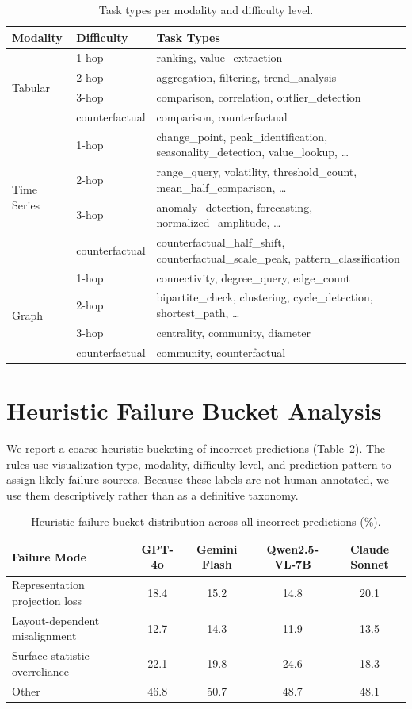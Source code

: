 \documentclass{article}
\begin{document}
\begin{table}[h]
\centering
\small
\caption{Task types per modality and difficulty level.}
\label{tab:task_diff_map}
\begin{tabular}{llp{10cm}}
\toprule
Modality & Difficulty & Task Types \\
\midrule
\multirow{4}{*}{Tabular} & 1-hop & ranking, value\_extraction \\
& 2-hop & aggregation, filtering, trend\_analysis \\
& 3-hop & comparison, correlation, outlier\_detection \\
& counterfactual & comparison, counterfactual \\
\midrule
\multirow{4}{*}{Time Series} & 1-hop & change\_point, peak\_identification, seasonality\_detection, value\_lookup, \ldots \\
& 2-hop & range\_query, volatility, threshold\_count, mean\_half\_comparison, \ldots \\
& 3-hop & anomaly\_detection, forecasting, normalized\_amplitude, \ldots \\
& counterfactual & counterfactual\_half\_shift, counterfactual\_scale\_peak, pattern\_classification \\
\midrule
\multirow{4}{*}{Graph} & 1-hop & connectivity, degree\_query, edge\_count \\
& 2-hop & bipartite\_check, clustering, cycle\_detection, shortest\_path, \ldots \\
& 3-hop & centrality, community, diameter \\
& counterfactual & community, counterfactual \\
\bottomrule
\end{tabular}
\end{table}

\section{Heuristic Failure Bucket Analysis}
\label{sec:failure_buckets}
We report a coarse heuristic bucketing of incorrect predictions (Table~\ref{tab:failure_modes}). The rules use visualization type, modality, difficulty level, and prediction pattern to assign likely failure sources. Because these labels are not human-annotated, we use them descriptively rather than as a definitive taxonomy.

\begin{table}[h]
\centering
\small
\caption{Heuristic failure-bucket distribution across all incorrect predictions (\%).}
\label{tab:failure_modes}
\begin{tabular}{lcccc}
\toprule
Failure Mode & GPT-4o & Gemini Flash & Qwen2.5-VL-7B & Claude Sonnet \\
\midrule
Representation projection loss & 18.4 & 15.2 & 14.8 & 20.1 \\
Layout-dependent misalignment & 12.7 & 14.3 & 11.9 & 13.5 \\
Surface-statistic overreliance & 22.1 & 19.8 & 24.6 & 18.3 \\
Other & 46.8 & 50.7 & 48.7 & 48.1 \\
\bottomrule
\end{tabular}
\end{table}
\end{document}
